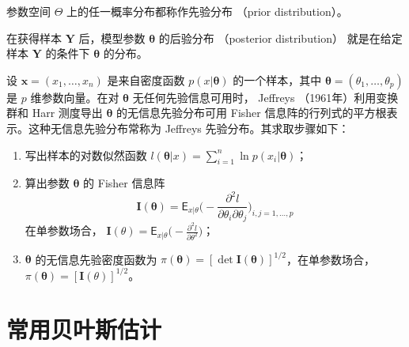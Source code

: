 \documentclass[12pt,a4paper,UTF8,twoside]{book}
\providecommand{\tightlist}{%
  \setlength{\itemsep}{0pt}\setlength{\parskip}{0pt}}
\theoremstyle{definition}
\theoremstyle{definition}
\theoremstyle{definition}
\theoremstyle{remark}
\let\BeginKnitrBlock\begin \let\EndKnitrBlock\end
\begin{document}
\BeginKnitrBlock{definition}[先验分布]
\protect\hypertarget{def:prior-distribution}{}{\label{def:prior-distribution}
{} }参数空间 \(\Theta\)
上的任一概率分布都称作先验分布 （prior distribution）\citep{mao2006}。
\EndKnitrBlock{definition}

\BeginKnitrBlock{definition}[后验分布]
\protect\hypertarget{def:posterior-distribution}{}{\label{def:posterior-distribution}
{} }在获得样本 \(\mathbf{Y}\) 后，模型参数
\(\boldsymbol{\theta}\) 的后验分布 （posterior distribution）
就是在给定样本 \(\mathbf{Y}\) 的条件下 \(\boldsymbol{\theta}\)
的分布\citep{mao2006}。
\EndKnitrBlock{definition}

\BeginKnitrBlock{definition}[Jeffreys 先验分布]
\protect\hypertarget{def:Jeffreys-prior-distribution}{}{\label{def:Jeffreys-prior-distribution}
{} }设 \(\mathbf{x} = (x_1,\ldots,x_n)\)
是来自密度函数 \(p(x|\boldsymbol{\theta})\) 的一个样本，其中
\(\boldsymbol{\theta} = (\theta_1,\ldots,\theta_p)\) 是 \(p\)
维参数向量。在对 \(\boldsymbol{\theta}\) 无任何先验信息可用时， Jeffreys
（1961年）利用变换群和 Harr 测度导出 \(\boldsymbol{\theta}\)
的无信息先验分布可用 Fisher
信息阵的行列式的平方根表示。这种无信息先验分布常称为 Jeffreys
先验分布。其求取步骤如下：
\EndKnitrBlock{definition}

\begin{enumerate}
\def\labelenumi{\arabic{enumi}.}
\tightlist
\item
  写出样本的对数似然函数
  \(l(\boldsymbol{\theta}|x) = \sum_{i=1}^{n}\ln p(x_i | \boldsymbol{\theta})\)；
\item
  算出参数 \(\boldsymbol{\theta}\) 的 Fisher 信息阵
  \[\mathbf{I}(\boldsymbol{\theta}) = \mathsf{E}_{x|\theta} \big( - \frac{\partial^2 l}{\partial \theta_i \partial \theta_j} \big)_{i,j=1,\ldots,p}\]
  在单参数场合，
  \(\mathbf{I}(\theta) = \mathsf{E}_{x|\theta} \big( - \frac{\partial^2 l}{\partial \theta^2} \big)\)；
\item
  \(\boldsymbol{\theta}\) 的无信息先验密度函数为
  \(\pi(\boldsymbol{\theta}) = [\det \mathbf{I}(\boldsymbol{\theta}) ]^{1/2}\)，在单参数场合，
  \(\pi(\boldsymbol{\theta}) = [\mathbf{I}(\theta) ]^{1/2}\)\citep{mao2006}。
\end{enumerate}

\hypertarget{sec:bayes-estimates}{%
\section{常用贝叶斯估计}\label{sec:bayes-estimates}}
\end{document}
